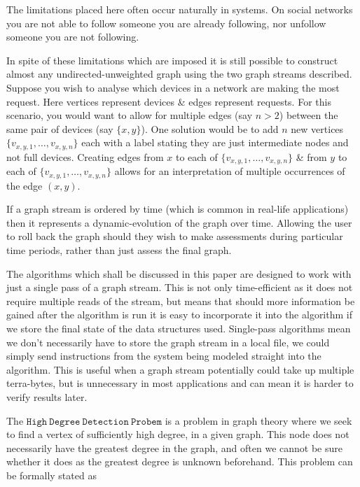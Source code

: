 \documentclass[11pt,twoside,a4paper]{report}
\begin{document}
\par The limitations placed here often occur naturally in systems. On social networks you are not able to follow someone you are already following, nor unfollow someone you are not following.
\par In spite of these limitations which are imposed it is still possible to construct almost any undirected-unweighted graph using the two graph streams described. Suppose you wish to analyse which devices in a network are making the most request. Here vertices represent devices \& edges represent requests. For this scenario, you would want to allow for multiple edges (say $n>2$) between the same pair of devices (say $\{x,y\}$). One solution would be to add $n$ new vertices $\{v_{x,y,1},\dots,v_{x,y,n}\}$ each with a label stating they are just intermediate nodes and not full devices. Creating edges from $x$ to each of $\{v_{x,y,1},\dots,v_{x,y,n}\}$ \& from $y$ to each of $\{v_{x,y,1},\dots,v_{x,y,n}\}$ allows for an interpretation of multiple occurrences of the edge $(x,y)$.
\par If a graph stream is ordered by time (which is common in real-life applications) then it represents a dynamic-evolution of the graph over time. Allowing the user to roll back the graph should they wish to make assessments during particular time periods, rather than just assess the final graph.
\par The algorithms which shall be discussed in this paper are designed to work with just a single pass of a graph stream. This is not only time-efficient as it does not require multiple reads of the stream, but means that should more information be gained after the algorithm is run it is easy to incorporate it into the algorithm if we store the final state of the data structures used. Single-pass algorithms mean we don't necessarily have to store the graph stream in a local file, we could simply send instructions from the system being modeled straight into the algorithm. This is useful when a graph stream potentially could take up multiple terra-bytes, but is unnecessary in most applications and can mean it is harder to verify results later.
\horizontalline
\par The $\mathtt{High\ Degree\ Detection\ Probem}$ is a problem in graph theory where we seek to find a vertex of sufficiently high degree, in a given graph. This node does not necessarily have the greatest degree in the graph, and often we cannot be sure whether it does as the greatest degree is unknown beforehand. This problem can be formally stated as
\end{document}
